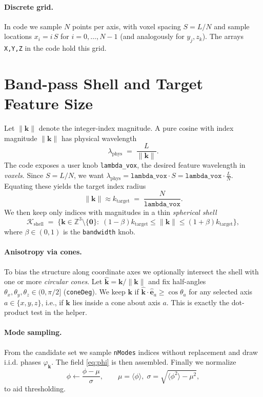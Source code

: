 \documentclass[11pt,a4paper]{article}
\newcommand{\Z}{\mathbb{Z}}
\newcommand{\vk}{\bm{k}}
\begin{document}
\paragraph{Discrete grid.} In code we sample $N$ points per axis, with voxel spacing $S=L/N$ and sample locations
\(x_i=i\,S\) for $i=0,\dots,N-1$ (and analogously for $y_j,z_k$). The arrays \texttt{X,Y,Z} in the code hold this grid.

\section{Band-pass Shell and Target Feature Size}
\label{sec:bandpass}
Let $\lVert \vk\rVert$ denote the integer-index magnitude. A pure cosine with index magnitude $\lVert\vk\rVert$ has physical wavelength
\begin{equation}
\lambda_{\text{phys}}\;=\;\frac{L}{\lVert\vk\rVert}.
\end{equation}
The code exposes a user knob \texttt{lambda\_vox}, the desired feature wavelength in \emph{voxels}. Since $S=L/N$, we want $\lambda_{\text{phys}}=\texttt{lambda\_vox}\cdot S=\texttt{lambda\_vox}\cdot\tfrac{L}{N}$. Equating these yields the target index radius
\begin{equation}
\label{eq:ktarget}
\lVert\vk\rVert\approx k_{\text{target}}\;=\;\frac{N}{\texttt{lambda\_vox}}.
\end{equation}
We then keep only indices with magnitudes in a thin \emph{spherical shell}
\begin{equation}
\label{eq:shell}
\mathcal{K}_{\text{shell}}\;=\;\Big\{\vk\in\Z^3\setminus\{\bm{0}\}:\; (1-\beta)k_{\text{target}}\le\lVert\vk\rVert\le(1+\beta)k_{\text{target}}\Big\},
\end{equation}
where $\beta\in(0,1)$ is the \texttt{bandwidth} knob.

\paragraph{Anisotropy via cones.} To bias the structure along coordinate axes we optionally intersect the shell with one or more \emph{circular cones}. Let $\hat{\vk}=\vk/\lVert\vk\rVert$ and fix half-angles $\theta_x,\theta_y,\theta_z\in(0,\pi/2]$ (\texttt{coneDeg}). We keep $\vk$ if $\hat{\vk}\cdot\hat{\bm{e}}_a\ge\cos\theta_a$ for any selected axis $a\in\{x,y,z\}$, i.e., if $\vk$ lies inside a cone about axis $a$. This is exactly the dot-product test in the helper.

\paragraph{Mode sampling.} From the candidate set we sample \texttt{nModes} indices without replacement and draw i.i.d. phases $\varphi_{\vk}$. The field \eqref{eq:phi} is then assembled. Finally we normalize
\begin{equation*}
\phi\leftarrow\frac{\phi-\mu}{\sigma},\qquad \mu=\langle\phi\rangle,\;\sigma=\sqrt{\langle\phi^2\rangle-\mu^2},
\end{equation*}
to aid thresholding.
\end{document}

